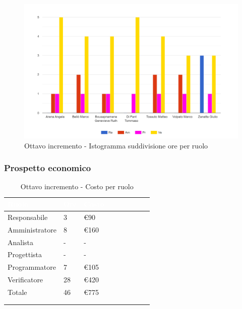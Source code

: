 {{      \begin{figure}[H]
        \includegraphics[width=15cm]{sezioni/images/ottavo.png}
        \centering
        \caption{Ottavo incremento - Istogramma suddivisione ore per ruolo}
     \end{figure}
    }

    \subsubsection{Prospetto economico}
    {
        \setlength{\freewidth}{\dimexpr\textwidth-30\tabcolsep}
        \renewcommand{\arraystretch}{1.0}
        \setlength{\aboverulesep}{0pt}
        \setlength{\belowrulesep}{0pt}
        \begin{longtable}{C{.4\freewidth} C{.2\freewidth} C{.2\freewidth} C{.2\freewidth} C{.2\freewidth} C{.2\freewidth} C{.2\freewidth} C{.2\freewidth} C{.2\freewidth}}
          \toprule
        \textcolor{white}{\textbf{Ruolo}}&
        \textcolor{white}{\textbf{Ore}}&
        \textcolor{white}{\textbf{Costo}}\\
        \toprule
        \endhead
            
        Responsabile  & 3 & \euro90\\
        Amministratore  & 8 & \euro160 \\
        Analista &- & -\\
        Progettista &- &-\\
        Programmatore &7 & \euro105\\
        Verificatore &28 &\euro420\\
        Totale&46&\euro775\\
        \bottomrule
      \\
        \caption{Ottavo incremento - Costo per ruolo}
        \end{longtable}

}}
